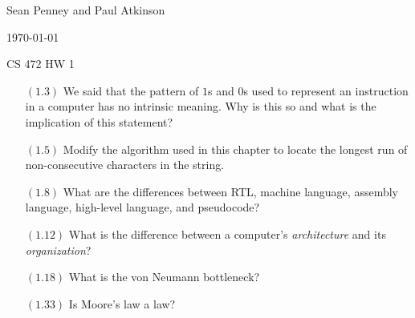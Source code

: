 \documentclass[letterpaper,10pt,titlepage]{article}
\def\name{Sean Penney and Paul Atkinson}
\begin{document}
\hfill \name

\hfill \today

\hfill CS 472 HW 1

\begin{enumerate}
\item[$(1.3)$] We said that the pattern of $1$s and $0$s used to represent an instruction
  in a computer has no intrinsic meaning. Why is this so and what is the implication of
  this statement?

\item[$(1.5)$] Modify the algorithm used in this chapter to locate the longest run of
  non-consecutive characters in the string.
\item[$(1.8)$] What are the differences between RTL, machine language, assembly language,
  high-level language, and pseudocode?
\item[$(1.12)$]What is the difference between a computer's \textit{architecture} and its
  \textit{organization}?
\item[$(1.18)$]What is the von Neumann bottleneck?
\item[$(1.33)$]Is Moore's law a law?

\end{enumerate}
\end{document}

